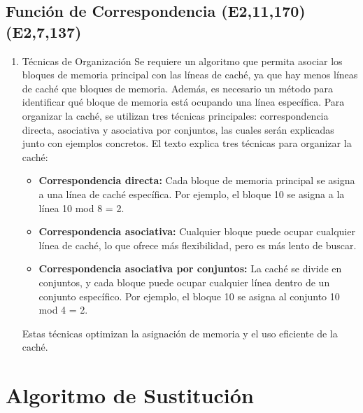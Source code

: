 \documentclass[presentation]{beamer}
\begin{document}
\subsection{Función de Correspondencia (E2,11,170)(E2,7,137)}
\label{sec:orge51c53c}
\begin{enumerate}
\item Técnicas de Organización
\label{sec:org8de9f13}
Se requiere un algoritmo que permita asociar los bloques de memoria principal con las líneas de caché, ya que hay menos líneas de caché que bloques de memoria. Además, es necesario un método para identificar qué bloque de memoria está ocupando una línea específica. Para organizar la caché, se utilizan tres técnicas principales: correspondencia directa, asociativa y asociativa por conjuntos, las cuales serán explicadas junto con ejemplos concretos.
El texto explica tres técnicas para organizar la caché:

\begin{itemize}
\item \textbf{\textbf{Correspondencia directa:}} Cada bloque de memoria principal se asigna a una línea de caché específica. Por ejemplo, el bloque 10 se asigna a la línea 10 mod 8 = 2.

\item \textbf{\textbf{Correspondencia asociativa:}} Cualquier bloque puede ocupar cualquier línea de caché, lo que ofrece más flexibilidad, pero es más lento de buscar.

\item \textbf{\textbf{Correspondencia asociativa por conjuntos:}} La caché se divide en conjuntos, y cada bloque puede ocupar cualquier línea dentro de un conjunto específico. Por ejemplo, el bloque 10 se asigna al conjunto 10 mod 4 = 2.
\end{itemize}

Estas técnicas optimizan la asignación de memoria y el uso eficiente de la caché.
\end{enumerate}

\section{Algoritmo de Sustitución}
\label{sec:org655ddab}
\end{document}
